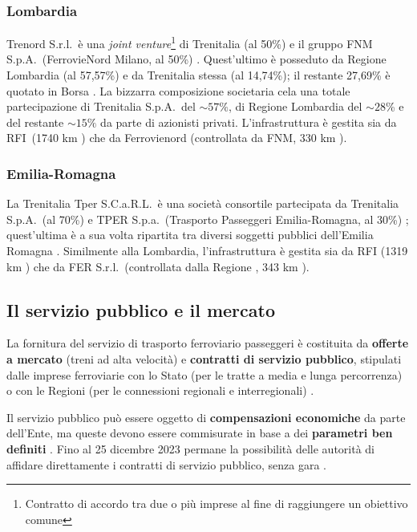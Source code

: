 \documentclass[12pt,italian]{report}
\begin{document}
	\subsubsection{Lombardia}
	
	Trenord S.r.l.\ è una \textit{joint venture}\footnote{Contratto di accordo tra due o più imprese al fine di raggiungere un obiettivo comune} di Trenitalia (al 50\%) e il gruppo FNM S.p.A.\ (FerrovieNord Milano, al 50\%) \cite{TrenordChiSiamo}. 
	Quest'ultimo è posseduto da Regione Lombardia (al 57,57\%) e da Trenitalia stessa (al 14,74\%); il restante 27,69\% è quotato in Borsa \cite{BorsaItalianaFNM}.
	La bizzarra composizione societaria cela una totale partecipazione di Trenitalia S.p.A.\ del $\sim 57\%$, di Regione Lombardia del $\sim 28$\% e del restante $\sim 15\%$ da parte di azionisti privati.
	L'infrastruttura è gestita sia da RFI\ (1740 km \cite{RfiKm}) che da Ferrovienord (controllata da FNM, 330 km \cite{FerNordKm}).
	
	\subsubsection{Emilia-Romagna}
	
	La Trenitalia Tper S.C.a.R.L.\ è una società consortile partecipata da Trenitalia S.p.A.\ (al 70\%) e TPER S.p.a.\ (Trasporto Passeggeri Emilia-Romagna, al 30\%) \cite{NascitaTper}; quest'ultima è a sua volta ripartita tra diversi soggetti pubblici dell'Emilia Romagna \cite{SociTper}.
	Similmente alla Lombardia, l'infrastruttura è gestita sia da RFI (1319 km \cite{RfiKm}) che da FER S.r.l.\ (controllata dalla Regione \cite{FerChiSiamo}, 343 km \cite{FerKm}).
	
	\subsection{Il servizio pubblico e il mercato}
	
	La fornitura del servizio di trasporto ferroviario passeggeri è costituita da \textbf{offerte a mercato} (treni ad alta velocità) e \textbf{contratti di servizio pubblico}, stipulati dalle imprese ferroviarie con lo Stato (per le tratte a media e lunga percorrenza) o con le Regioni (per le connessioni regionali e interregionali) \cite[vedi][paragrafo \textit{``Gli obblighi di servizio pubblico e i contratti di servizio''}]{CameraTrasportoFerroviario}.
	
	Il servizio pubblico può essere oggetto di \textbf{compensazioni economiche} da parte dell'Ente, ma queste devono essere commisurate in base a dei \textbf{parametri ben definiti} \cite[art.\ 4, comma 1]{Reg1370}.
	Fino al 25 dicembre 2023 permane la possibilità delle autorità di affidare direttamente i contratti di servizio pubblico, senza gara \cite[art.\ 8, comma 2, lettera iii)]{Reg1370}.
	
\end{document}
